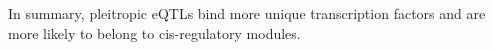 In summary, pleitropic eQTLs bind more unique transcription factors and are more
likely to belong to cis-regulatory modules.

%
%
%
